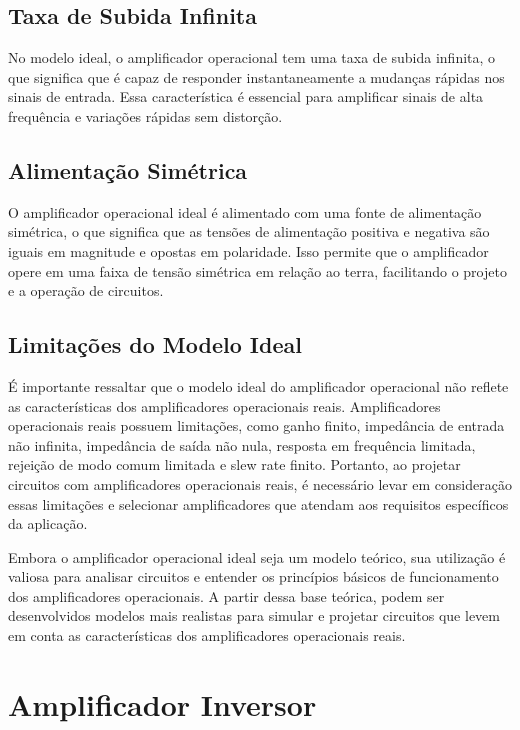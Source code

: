\documentclass[12pt,twoside, a4paper, twocolumn]{article}
\begin{document}
\subsection{Taxa de Subida Infinita}

No modelo ideal, o amplificador operacional tem uma taxa de subida infinita, o que significa que é capaz de responder instantaneamente a mudanças rápidas nos sinais de entrada. Essa característica é essencial para amplificar sinais de alta frequência e variações rápidas sem distorção.

\subsection{Alimentação Simétrica}

O amplificador operacional ideal é alimentado com uma fonte de alimentação simétrica, o que significa que as tensões de alimentação positiva e negativa são iguais em magnitude e opostas em polaridade. Isso permite que o amplificador opere em uma faixa de tensão simétrica em relação ao terra, facilitando o projeto e a operação de circuitos.

\subsection{Limitações do Modelo Ideal}

É importante ressaltar que o modelo ideal do amplificador operacional não reflete as características dos amplificadores operacionais reais. Amplificadores operacionais reais possuem limitações, como ganho finito, impedância de entrada não infinita, impedância de saída não nula, resposta em frequência limitada, rejeição de modo comum limitada e slew rate finito. Portanto, ao projetar circuitos com amplificadores operacionais reais, é necessário levar em consideração essas limitações e selecionar amplificadores que atendam aos requisitos específicos da aplicação.

Embora o amplificador operacional ideal seja um modelo teórico, sua utilização é valiosa para analisar circuitos e entender os princípios básicos de funcionamento dos amplificadores operacionais. A partir dessa base teórica, podem ser desenvolvidos modelos mais realistas para simular e projetar circuitos que levem em conta as características dos amplificadores operacionais reais.


\newpage

\section{Amplificador Inversor}
\end{document}
